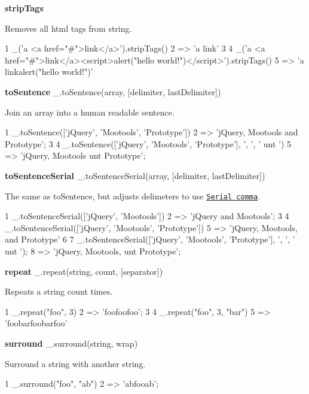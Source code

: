 {\bfseries strip\+Tags}

Removes all html tags from string.


\begin{DoxyCode}
1 \_('a <a href="#">link</a>').stripTags()
2 => 'a link'
3 
4 \_('a <a href="#">link</a><script>alert("hello world!")</script>').stripTags()
5 => 'a linkalert("hello world!")'
\end{DoxyCode}


{\bfseries to\+Sentence} \+\_\+.\+to\+Sentence(array, \mbox{[}delimiter, last\+Delimiter\mbox{]})

Join an array into a human readable sentence.


\begin{DoxyCode}
1 \_.toSentence(['jQuery', 'Mootools', 'Prototype'])
2 => 'jQuery, Mootools and Prototype';
3 
4 \_.toSentence(['jQuery', 'Mootools', 'Prototype'], ', ', ' unt ')
5 => 'jQuery, Mootools unt Prototype';
\end{DoxyCode}


{\bfseries to\+Sentence\+Serial} \+\_\+.\+to\+Sentence\+Serial(array, \mbox{[}delimiter, last\+Delimiter\mbox{]})

The same as {\ttfamily to\+Sentence}, but adjusts delimeters to use \href{http://en.wikipedia.org/wiki/Serial_comma}{\tt Serial comma}.


\begin{DoxyCode}
1 \_.toSentenceSerial(['jQuery', 'Mootools'])
2 => 'jQuery and Mootools';
3 
4 \_.toSentenceSerial(['jQuery', 'Mootools', 'Prototype'])
5 => 'jQuery, Mootools, and Prototype'
6 
7 \_.toSentenceSerial(['jQuery', 'Mootools', 'Prototype'], ', ', ' unt ');
8 => 'jQuery, Mootools, unt Prototype';
\end{DoxyCode}


{\bfseries repeat} \+\_\+.\+repeat(string, count, \mbox{[}separator\mbox{]})

Repeats a string count times.


\begin{DoxyCode}
1 \_.repeat("foo", 3)
2 => 'foofoofoo';
3 
4 \_.repeat("foo", 3, "bar")
5 => 'foobarfoobarfoo'
\end{DoxyCode}


{\bfseries surround} \+\_\+.\+surround(string, wrap)

Surround a string with another string.


\begin{DoxyCode}
1 \_.surround("foo", "ab")
2 => 'abfooab';
\end{DoxyCode}


